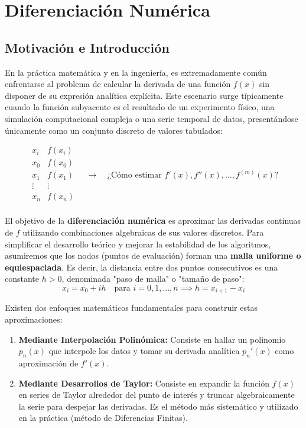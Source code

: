 \section{Diferenciación Numérica}

\subsection{Motivación e Introducción}

En la práctica matemática y en la ingeniería, es extremadamente común enfrentarse al problema de calcular la derivada de una función $f(x)$ sin disponer de su expresión analítica explícita. Este escenario surge típicamente cuando la función subyacente es el resultado de un experimento físico, una simulación computacional compleja o una serie temporal de datos, presentándose únicamente como un conjunto discreto de valores tabulados:

\[
    \begin{array}{c|c}
        x_i & f(x_i) \\
        \hline
        x_0 & f(x_0) \\
        x_1 & f(x_1) \\
        \vdots & \vdots \\
        x_n & f(x_n) \\
    \end{array}
    \quad \longrightarrow \quad
    \text{¿Cómo estimar } f'(x), f''(x), \ldots, f^{(m)}(x) \text{?}
\]

El objetivo de la \textbf{diferenciación numérica} es aproximar las derivadas continuas de $f$ utilizando combinaciones algebraicas de sus valores discretos. Para simplificar el desarrollo teórico y mejorar la estabilidad de los algoritmos, asumiremos que los nodos (puntos de evaluación) forman una \textbf{malla uniforme o equiespaciada}. Es decir, la distancia entre dos puntos consecutivos es una constante $h > 0$, denominada "paso de malla" o "tamaño de paso":
\[
    x_i = x_0 + i h \quad \text{para } i = 0, 1, \ldots, n \implies h = x_{i+1} - x_i
\]

Existen dos enfoques matemáticos fundamentales para construir estas aproximaciones:
\begin{enumerate}
    \item[A.] \textbf{Mediante Interpolación Polinómica:} Consiste en hallar un polinomio $p_n(x)$ que interpole los datos y tomar su derivada analítica $p_n'(x)$ como aproximación de $f'(x)$.
    \item[B.] \textbf{Mediante Desarrollos de Taylor:} Consiste en expandir la función $f(x)$ en series de Taylor alrededor del punto de interés y truncar algebraicamente la serie para despejar las derivadas. Es el método más sistemático y utilizado en la práctica (método de Diferencias Finitas).
\end{enumerate}

